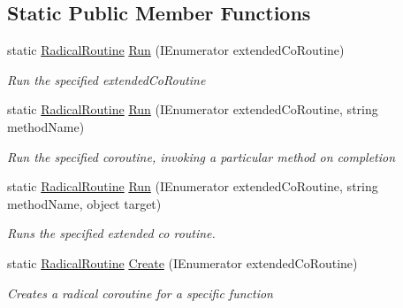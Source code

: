 \subsection*{Static Public Member Functions}
\begin{DoxyCompactItemize}
\item 
static \hyperlink{class_radical_routine}{Radical\+Routine} \hyperlink{class_radical_routine_a548acf1cd3335a543c8014a87d2fa26b}{Run} (I\+Enumerator extended\+Co\+Routine)
\begin{DoxyCompactList}\small\item\em Run the specified extended\+Co\+Routine \end{DoxyCompactList}\item 
static \hyperlink{class_radical_routine}{Radical\+Routine} \hyperlink{class_radical_routine_ac64373a158f06b92f5d1c0052a49c3b6}{Run} (I\+Enumerator extended\+Co\+Routine, string method\+Name)
\begin{DoxyCompactList}\small\item\em Run the specified coroutine, invoking a particular method on completion \end{DoxyCompactList}\item 
static \hyperlink{class_radical_routine}{Radical\+Routine} \hyperlink{class_radical_routine_a569f25f7a79cec6bee8998d2927e1de2}{Run} (I\+Enumerator extended\+Co\+Routine, string method\+Name, object target)
\begin{DoxyCompactList}\small\item\em Runs the specified extended co routine. \end{DoxyCompactList}\item 
static \hyperlink{class_radical_routine}{Radical\+Routine} \hyperlink{class_radical_routine_ac6e7a37c8a2b76dde3bbaf486faffd4b}{Create} (I\+Enumerator extended\+Co\+Routine)
\begin{DoxyCompactList}\small\item\em Creates a radical coroutine for a specific function \end{DoxyCompactList}\end{DoxyCompactItemize}
